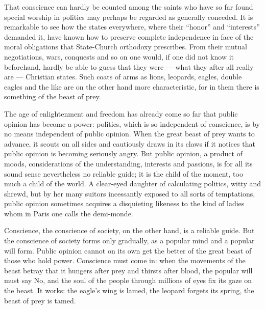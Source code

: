 \documentclass[12pt,a4paper,openany]{book}
\newcommand{\opage}[1]{\marginnote{\footnotesize\textit{[#1]}}}
\begin{document}
That conscience can hardly be counted among the
saints who have so far found special worship in
politics may perhaps be regarded as generally conceded.
It is remarkable to see how the states everywhere,
where their ``honor'' and ``interests'' demanded it, have
known how to preserve complete independence in face
of the moral obligations that State-Church
orthodoxy prescribes. From their mutual 
\setcounter{footnote}{0}%
\opage{66}negotiations, wars, conquests and so on one would, if
one did not know it beforehand, hardly be able to guess
that they were --- what they after all really are ---
Christian states. Such coats of arms as lions,
leopards, eagles, double eagles and the like are on the other hand more
characteristic, for in them there is something of the beast of prey.

The age of enlightenment and freedom has already come
so far that public opinion has become a power:
politics, which is so independent of conscience, is
by no means independent of public opinion. When
the great beast of prey wants to advance, it scouts on all sides and
cautiously draws in its claws if it notices that
public opinion is becoming seriously angry. But public
opinion, a product of moods, considerations of the understanding,
interests and passions, is for all
its sound sense nevertheless no reliable guide; it is
the child of the moment, too much a child of the world. A
clear-eyed daughter of calculating politics, witty and shrewd,
but by her many suitors incessantly exposed to all sorts of
temptations, public opinion sometimes acquires a
disquieting likeness to the kind of ladies whom in Paris one
calls the demi-monde.

Conscience, the conscience of society, on the other hand,
is a reliable guide. But the conscience of society
forms only gradually, as a
popular mind and a popular will form. Public opinion
cannot on its own get the better of the great beast of
those who hold power. Conscience must come in: when
the movements of the beast betray that it hungers after prey
and thirsts after blood, the popular will must say No, and
the soul of the people through millions of eyes fix its gaze
on the beast. It works: the eagle's wing is lamed, the 
\setcounter{footnote}{0}%
\opage{67}leopard forgets its spring, the beast of prey is
tamed.
\end{document}
